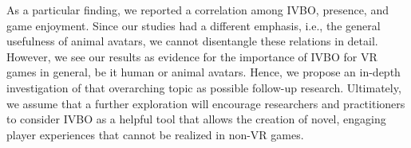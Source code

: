 \documentclass{sigchi}
\begin{document}
As a particular finding, we reported a correlation among IVBO, presence, and game enjoyment. Since our studies had a different emphasis, i.e., the general usefulness of animal avatars, we cannot disentangle these relations in detail. However, we see our results as evidence for the importance of IVBO for VR games in general, be it human or animal avatars. Hence, we propose an in-depth investigation of that overarching topic as possible follow-up research. Ultimately, we assume that a further exploration will encourage researchers and practitioners to consider IVBO as a helpful tool that allows the creation of novel, engaging player experiences that cannot be realized in non-VR games.




\balance{}



\end{document}
